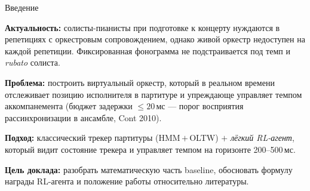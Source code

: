 \begin{frame}{Введение}

\textbf{Актуальность:} солисты-пианисты при подготовке к концерту
нуждаются в репетициях с оркестровым сопровождением, однако живой
оркестр недоступен на каждой репетиции. Фиксированная фонограмма не
подстраивается под темп и \emph{rubato} солиста.

\bigskip

\textbf{Проблема:} построить виртуальный оркестр, который в реальном
времени отслеживает позицию исполнителя в партитуре и упреждающе
управляет темпом аккомпанемента (бюджет задержки $\le 20$\,мс ---
порог восприятия рассинхронизации в ансамбле, Cont 2010).

\bigskip

\textbf{Подход:} классический трекер партитуры (HMM\,$+$\,OLTW)
$+$ \emph{лёгкий RL-агент}, который видит состояние трекера и
управляет темпом на горизонте 200--500\,мс.

\bigskip

\textbf{Цель доклада:} разобрать математическую часть baseline,
обосновать формулу награды RL-агента и положение работы относительно
литературы.

\end{frame}
